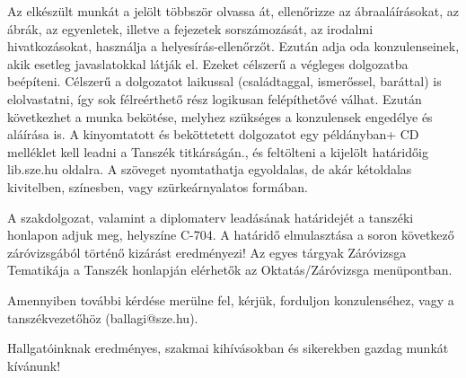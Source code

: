 Az elkészült munkát a jelölt többször olvassa át, ellenőrizze az ábraaláírásokat, az ábrák, az egyenletek, illetve a fejezetek sorszámozását, az irodalmi hivatkozásokat, használja a helyesírás-ellenőrzőt. Ezután adja oda konzulenseinek, akik esetleg javaslatokkal látják el. Ezeket célszerű a végleges dolgozatba beépíteni. Célszerű a dolgozatot laikussal (családtaggal, ismerőssel, baráttal) is elolvastatni, így sok félreérthető rész logikusan felépíthetővé válhat. Ezután következhet a munka bekötése, melyhez szükséges a konzulensek engedélye és aláírása is. A kinyomtatott és beköttetett dolgozatot  egy példányban+ CD melléklet  kell leadni a Tanszék titkárságán., és feltölteni a kijelölt határidőig lib.sze.hu oldalra. A szöveget nyomtathatja egyoldalas, de akár kétoldalas kivitelben, színesben, vagy szürkeárnyalatos formában.

A szakdolgozat, valamint a diplomaterv leadásának határidejét a tanszéki honlapon adjuk meg, helyszíne C-704.  A határidő elmulasztása a soron következő záróvizsgából történő kizárást eredményezi! Az egyes tárgyak Záróvizsga Tematikája a Tanszék honlapján elérhetők az Oktatás/Záróvizsga menüpontban. 

Amennyiben további kérdése merülne fel, kérjük, forduljon konzulenséhez, vagy a tanszékvezetőhöz (ballagi@sze.hu). 

Hallgatóinknak eredményes, szakmai kihívásokban és sikerekben gazdag munkát kívánunk!
